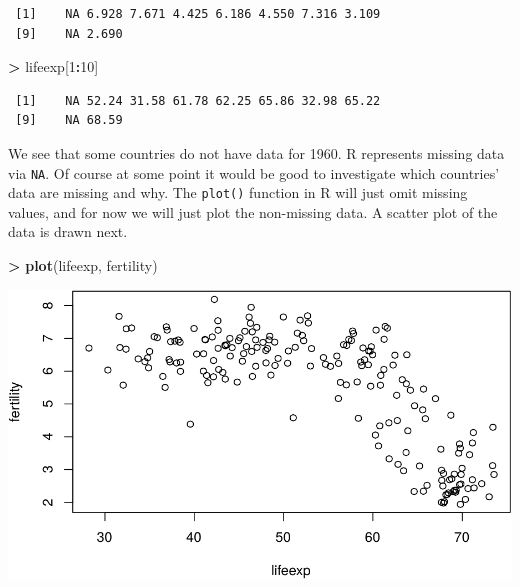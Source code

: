 \documentclass[]{krantz}
\makeatletter
\newenvironment{Shaded}{\begin{snugshade}}{\end{snugshade}}
\newcommand{\DecValTok}[1]{\textcolor[rgb]{0.06,0.06,0.06}{#1}}
\newcommand{\KeywordTok}[1]{\textcolor[rgb]{0.27,0.27,0.27}{\textbf{#1}}}
\newcommand{\NormalTok}[1]{#1}
\newcommand{\OperatorTok}[1]{\textcolor[rgb]{0.43,0.43,0.43}{\textbf{#1}}}
\newcommand{\StringTok}[1]{\textcolor[rgb]{0.5,0.5,0.5}{#1}}
\newenvironment{kframe}{%
\medskip{}
\setlength{\fboxsep}{.8em}
 \def\at@end@of@kframe{}%
 \ifinner\ifhmode%
  \def\at@end@of@kframe{\end{minipage}}%
  \begin{minipage}{\columnwidth}%
 \fi\fi%
 \def\FrameCommand##1{\hskip\@totalleftmargin \hskip-\fboxsep
 \colorbox{shadecolor}{##1}\hskip-\fboxsep
     \hskip-\linewidth \hskip-\@totalleftmargin \hskip\columnwidth}%
 \MakeFramed {\advance\hsize-\width
   \@totalleftmargin\z@ \linewidth\hsize
   \@setminipage}}%
 {\par\unskip\endMakeFramed%
 \at@end@of@kframe}
\renewenvironment{Shaded}{\begin{kframe}}{\end{kframe}}
\makeatother
\begin{document}
\begin{Shaded}
\end{Shaded}

\begin{verbatim}
 [1]    NA 6.928 7.671 4.425 6.186 4.550 7.316 3.109
 [9]    NA 2.690
\end{verbatim}

\begin{Shaded}
\begin{Highlighting}[]
\OperatorTok{>}\StringTok{ }\NormalTok{lifeexp[}\DecValTok{1}\OperatorTok{:}\DecValTok{10}\NormalTok{]}
\end{Highlighting}
\end{Shaded}

\begin{verbatim}
 [1]    NA 52.24 31.58 61.78 62.25 65.86 32.98 65.22
 [9]    NA 68.59
\end{verbatim}

We see that some countries do not have data for 1960. R represents missing data via \texttt{NA}. Of course at some point it would be good to investigate which countries' data are missing and why. The \texttt{plot()} function in R will just omit missing values, and for now we will just plot the non-missing data. A scatter plot of the data is drawn next.

\begin{Shaded}
\begin{Highlighting}[]
\OperatorTok{>}\StringTok{ }\KeywordTok{plot}\NormalTok{(lifeexp, fertility)}
\end{Highlighting}
\end{Shaded}

\includegraphics{bookdown_files/figure-latex/unnamed-chunk-13-1.pdf}
\end{document}
